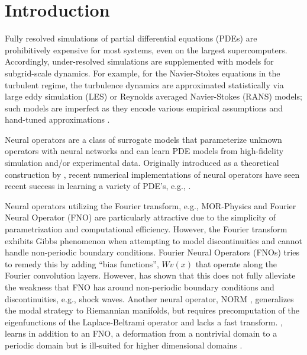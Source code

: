 \section{Introduction}\label{intro}

Fully resolved simulations of partial differential equations (PDEs) are prohibitively expensive for most systems, even on the largest supercomputers. Accordingly, under-resolved simulations are supplemented with models for subgrid-scale dynamics. For example, for the Navier-Stokes equations in the turbulent regime, the turbulence dynamics are approximated statistically via large eddy simulation (LES) or Reynolds averaged Navier-Stokes (RANS) models; such models are imperfect as they encode various empirical assumptions and hand-tuned approximations \cite{Pope_2000}.

Neural operators are a class of surrogate models that parameterize unknown operators with neural networks and can learn %
PDE models from high-fidelity simulation and/or experimental data. %
Originally introduced as a theoretical construction by \cite{Chen1995}, recent numerical implementations of neural operators have seen recent success in learning a variety of PDE's, e.g., \cite{patel2018MOR_Operator,patel2021MOR_Operator2,li2021FNO,Lu2021deeponet,rahman2023uno,Tapas2023wavelet}.


Neural operators utilizing the Fourier transform, e.g., MOR-Physics \cite{patel2018MOR_Operator} and Fourier Neural Operator (FNO) \cite{li2021FNO} are particularly attractive due to the simplicity of parametrization and computational efficiency. However, the Fourier transform exhibits Gibbs phenomenon when attempting to model discontinuities and cannot handle non-periodic boundary conditions. Fourier Neural Operators (FNOs) \cite{li2021FNO} tries to remedy this by adding ``bias functions'', \(Wv(x)\) that operate along the Fourier convolution layers. However, \cite{lu2022FNOvsDeepONet} has shown that this does not fully alleviate the weakness that FNO has around non-periodic boundary conditions and discontinuities, e.g., shock waves. Another neural operator, NORM \cite{Chen2024riemannian}, generalizes the modal strategy to Riemannian manifolds, but requires precomputation of the eigenfunctions of the Laplace-Beltrami operator and lacks a fast transform. \citep{Li2023deform}, learns in addition to an FNO, a deformation from a nontrivial domain to a periodic domain but is ill-suited for higher dimensional domains \cite{Chen2024riemannian}.

